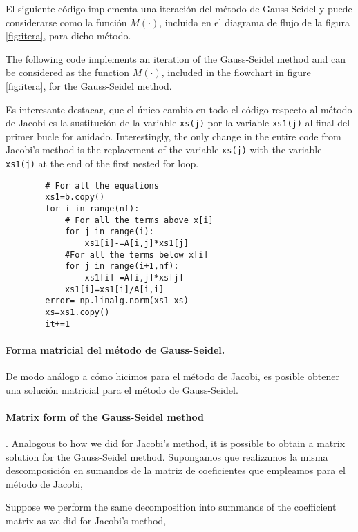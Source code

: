\begin{paracol}{2}

El siguiente código implementa una iteración del método de Gauss-Seidel y puede considerarse como la función $M(\cdot)$, incluida en el diagrama de flujo de la figura \ref{fig:itera}, para dicho método. 

\switchcolumn
The following code implements an iteration of the Gauss-Seidel method and can be considered as the function $M(\cdot)$, included in the flowchart in figure \ref{fig:itera}, for the Gauss-Seidel method.    

\switchcolumn
Es interesante destacar, que el único cambio en todo el código respecto al método de Jacobi es la sustitución de la variable \texttt{xs(j)} por la variable \texttt{xs1(j)} al final del primer bucle for anidado.
\switchcolumn
Interestingly, the only change in the entire code from Jacobi's method is the replacement of the variable \texttt{xs(j)} with the variable \texttt{xs1(j)} at the end of the first nested for loop.
\end{paracol}
\begin{verbatim}
        # For all the equations
        xs1=b.copy()
        for i in range(nf):
            # For all the terms above x[i]
            for j in range(i):
                xs1[i]-=A[i,j]*xs1[j]
            #For all the terms below x[i]    
            for j in range(i+1,nf):
                xs1[i]-=A[i,j]*xs[j]
            xs1[i]=xs1[i]/A[i,i]
        error= np.linalg.norm(xs1-xs)
        xs=xs1.copy()
        it+=1
\end{verbatim}
\begin{paracol}{2}
\paragraph{Forma matricial del método de Gauss-Seidel.}  De modo análogo a cómo hicimos para el método de Jacobi, es posible obtener una solución matricial para el método de Gauss-Seidel. 
\switchcolumn

\paragraph{Matrix form of the Gauss-Seidel method}.  Analogous to how we did for Jacobi's method, it is possible to obtain a matrix solution for the Gauss-Seidel method. 
\switchcolumn
Supongamos que realizamos la misma descomposición en sumandos de la matriz de coeficientes que empleamos para el método de Jacobi,    
\switchcolumn

Suppose we perform the same decomposition into summands of the coefficient matrix as we did for Jacobi's method,

\end{paracol}

